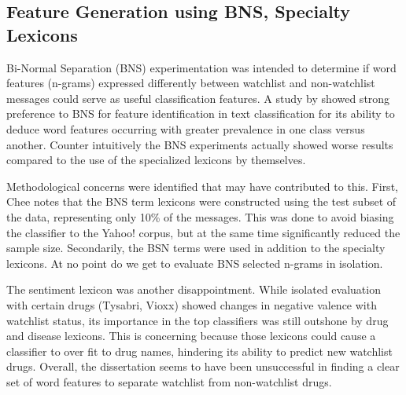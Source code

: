 \documentclass[twoside,11pt]{article}
\begin{document}
\subsection{Feature Generation using BNS, Specialty Lexicons}
Bi-Normal Separation (BNS) experimentation was intended to determine if word features (n-grams) expressed differently between watchlist and non-watchlist messages could serve as useful classification features. A study by \citet{Forman} showed strong preference to BNS for feature identification in text classification for its ability to deduce word features occurring with greater prevalence in one class versus another. Counter intuitively the BNS experiments actually showed worse results compared to the use of the specialized lexicons by themselves.
\par Methodological concerns were identified that may have contributed to this. First, Chee notes that the BNS term lexicons were constructed using the test subset of the data, representing only 10\% of the messages. This was done to avoid biasing the classifier to the Yahoo! corpus, but at the same time significantly reduced the sample size. Secondarily, the BSN terms were used in addition to the specialty lexicons. At no point do we get to evaluate BNS selected n-grams in isolation.
\par The sentiment lexicon was another disappointment. While isolated evaluation with certain drugs (Tysabri, Vioxx) showed changes in negative valence with watchlist status, its importance in the top classifiers was still outshone by drug and disease lexicons. This is concerning because those lexicons could cause a classifier to over fit to drug names, hindering its ability to predict new watchlist drugs. Overall, the dissertation seems to have been unsuccessful in finding a clear set of word features to separate watchlist from non-watchlist drugs.
\end{document}
